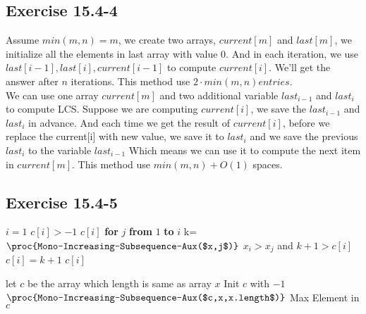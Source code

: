 \documentclass[12pt]{article}
\theoremstyle{definition}
\theoremstyle{remark}
\begin{document}
\subsection*{Exercise 15.4-4}
Assume $min(m,n)=m$, we create two arrays, $current[m]$ and $last[m]$, we initialize all the elements in last array with value 0. And in each iteration, we use $last[i-1],last[i],current[i-1]$ to compute $current[i]$. We'll get the answer after $n$ iterations. This method use $2\cdot min(m,n) entries$.\\
We can use one array $current[m]$ and two additional variable $last_{i-1}$ and $last_i$ to compute LCS. Suppose we are computing $current[i]$, we save the $last_{i-1}$ and $last_i$ in advance. And each time we get the result of $current[i]$, before we replace the current[i] with new value, we save it to $last_i$ and we save the previous $last_i$ to the variable $last_{i-1}$ Which means we can use it to compute the next item in $current[m]$. This method use $min(m,n)+O(1)$ spaces.
\subsection*{Exercise 15.4-5}
\begin{codebox}
\li \If $i=1$ \label{li:if}
\li \quad {}
\li \If $c[i]>-1$ \label{li:if}
\li \quad \Return $c[i]$
\li \textbf{for} $j$ \textbf{from} $1$ \textbf{to} $i$
\li \quad k=$\proc{Mono-Increasing-Subsequence-Aux($x,j$)}$
\li \quad \If $x_i>x_j$ and $k+1>c[i]$ \label{li:if}
\li \qquad $c[i]=k+1$
\li \Return $c[i]$
\end{codebox}
\begin{codebox}
\li let $c$ be the array which length is same as array $x$
\li Init $c$ with $-1$
\li $\proc{Mono-Increasing-Subsequence-Aux($c,x,x.length$)}$
\li \Return Max Element in $c$
\end{codebox}
\end{document}
